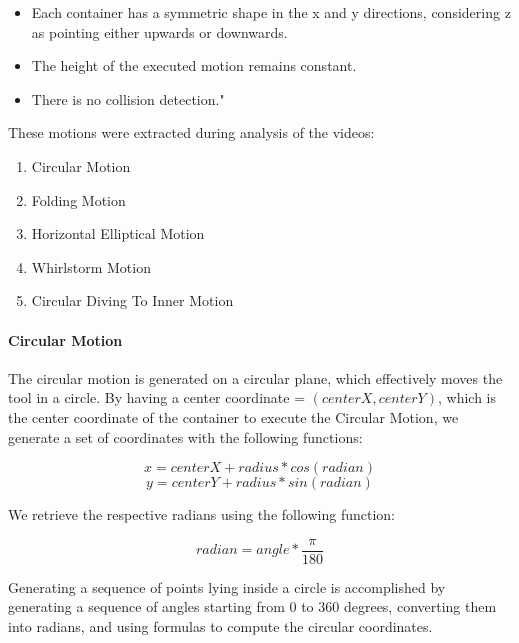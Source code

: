 \begin{itemize}
  \item Each container has a symmetric shape in the x and y directions, considering z as pointing either upwards or downwards.
  \item The height of the executed motion remains constant.
  \item There is no collision detection."
\end{itemize}

These motions were extracted during analysis of the videos:

\begin{enumerate}
  \item Circular Motion
  \item Folding Motion
  \item Horizontal Elliptical Motion
  \item Whirlstorm Motion
  \item Circular Diving To Inner Motion 
\end{enumerate}

\paragraph{Circular Motion}
The circular motion is generated on a circular plane, which effectively moves the tool in a circle. 
By having a center coordinate = $(centerX, centerY)$, which is the center coordinate of 
the container to execute the Circular Motion, we generate a set of coordinates
with the following functions: 

\[x = centerX + radius * cos(radian)\]
\[y = centerY + radius * sin(radian)\]

We retrieve the respective radians using the following function:

\[radian = angle * \frac{\pi}{180}\]

Generating a sequence of points lying inside a circle is accomplished by generating a sequence of angles starting from 0 to 360 degrees, 
converting them into radians, and using formulas to compute the circular coordinates.


